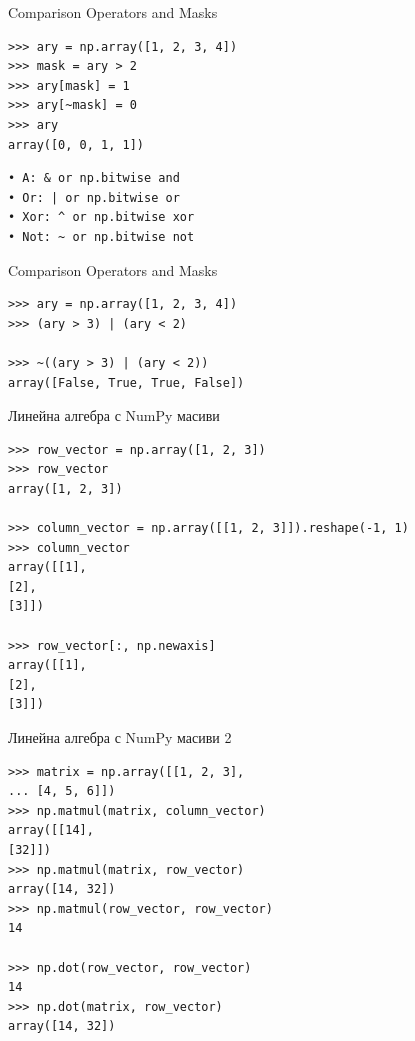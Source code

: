 \documentclass{beamer}
\begin{document}
\begin{frame}[fragile]{Comparison Operators and Masks}
\begin{verbatim}
>>> ary = np.array([1, 2, 3, 4])
>>> mask = ary > 2
>>> ary[mask] = 1
>>> ary[~mask] = 0
>>> ary
array([0, 0, 1, 1])
\end{verbatim}


\begin{verbatim}
• A: & or np.bitwise and
• Or: | or np.bitwise or
• Xor: ^ or np.bitwise xor
• Not: ~ or np.bitwise not
\end{verbatim}

\end{frame}

\begin{frame}[fragile]{Comparison Operators and Masks}
\begin{verbatim}
>>> ary = np.array([1, 2, 3, 4])
>>> (ary > 3) | (ary < 2)

>>> ~((ary > 3) | (ary < 2))
array([False, True, True, False])
\end{verbatim}
\end{frame}

\begin{frame}[fragile]{Линейна алгебра с NumPy масиви}
\begin{verbatim}
>>> row_vector = np.array([1, 2, 3])
>>> row_vector
array([1, 2, 3])

>>> column_vector = np.array([[1, 2, 3]]).reshape(-1, 1)
>>> column_vector
array([[1],
[2],
[3]])

>>> row_vector[:, np.newaxis]
array([[1],
[2],
[3]])
\end{verbatim}
\end{frame}

\begin{frame}[fragile]{Линейна алгебра с NumPy масиви 2 }

\begin{verbatim}
>>> matrix = np.array([[1, 2, 3],
... [4, 5, 6]])
>>> np.matmul(matrix, column_vector)
array([[14],
[32]])
>>> np.matmul(matrix, row_vector)
array([14, 32])
>>> np.matmul(row_vector, row_vector)
14

>>> np.dot(row_vector, row_vector)
14
>>> np.dot(matrix, row_vector)
array([14, 32])

\end{verbatim}
\end{frame}
\end{document}

